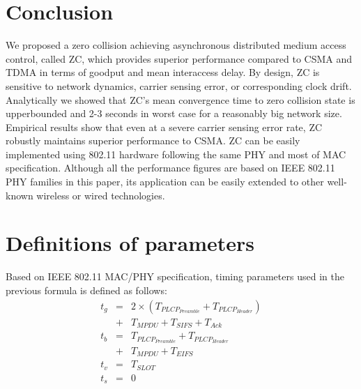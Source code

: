 \documentclass{acm_proc_article-sp}
\newcommand{\be}{\begin{eqnarray}}
\newcommand{\ee}{\end{eqnarray}}
\newcommand{\sub}{}
\begin{document}
\section{Conclusion}
\label{conclusion}
We proposed a zero collision achieving asynchronous distributed medium access control, called ZC, which provides superior performance compared to CSMA and TDMA in terms of goodput and mean interaccess delay. By design, ZC is sensitive to network dynamics, carrier sensing error, or corresponding clock drift. Analytically we showed that ZC's mean convergence time to zero collision state is upperbounded and 2-3 seconds in worst case for a reasonably big network size. Empirical results show that even at a severe carrier sensing error rate, ZC robustly maintains superior performance to CSMA.
ZC can be easily implemented using 802.11 hardware following the same PHY and most of MAC specification. Although all the performance figures are based on IEEE 802.11 PHY families in this paper, its application can be easily extended to other well-known wireless or wired technologies.






  


\appendix
\section{Definitions of parameters}
Based on IEEE 802.11 MAC/PHY specification, timing parameters used in the previous formula is defined as follows:
\be
t_g &=& 2 \times (T_{PLCP_{Preamble}} + T_{PLCP_{Header}})\\
    &+& T_{MPDU} + T_{SIFS} + T_{Ack}\\
t_b &=& T_{PLCP_{Preamble}} + T_{PLCP_{Header}} \\
    &+& T_{MPDU} + T_{EIFS}\\
t_v &=& T_{SLOT}\\
t_s &=& 0\sub
\ee
\balancecolumns
\end{document}
